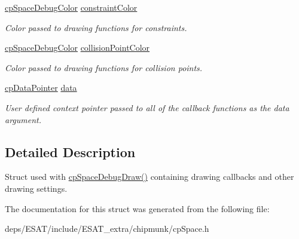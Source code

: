 \begin{DoxyCompactItemize}
\mbox{\hyperlink{structcp_space_debug_color}{cp\+Space\+Debug\+Color}} \mbox{\hyperlink{structcp_space_debug_draw_options_a62271599c7cb15d39f6a2b4620173322}{constraint\+Color}}
\begin{DoxyCompactList}\small\item\em Color passed to drawing functions for constraints. \end{DoxyCompactList}\item 
\mbox{\label{structcp_space_debug_draw_options_aaa3ebd801675e71f6ce0954514d3e9aa}} 
\mbox{\hyperlink{structcp_space_debug_color}{cp\+Space\+Debug\+Color}} \mbox{\hyperlink{structcp_space_debug_draw_options_aaa3ebd801675e71f6ce0954514d3e9aa}{collision\+Point\+Color}}
\begin{DoxyCompactList}\small\item\em Color passed to drawing functions for collision points. \end{DoxyCompactList}\item 
\mbox{\label{structcp_space_debug_draw_options_a68c76e73a9a75b589bb1d26925fcc3e4}} 
\mbox{\hyperlink{group__basic_types_ga2ac2c3c31e21893941f9e4f8ee279447}{cp\+Data\+Pointer}} \mbox{\hyperlink{structcp_space_debug_draw_options_a68c76e73a9a75b589bb1d26925fcc3e4}{data}}
\begin{DoxyCompactList}\small\item\em User defined context pointer passed to all of the callback functions as the \textquotesingle{}data\textquotesingle{} argument. \end{DoxyCompactList}\end{DoxyCompactItemize}


\subsection{Detailed Description}
Struct used with \mbox{\hyperlink{group__cp_space_ga02e8a34681aff3f29bd976e830f3b6da}{cp\+Space\+Debug\+Draw()}} containing drawing callbacks and other drawing settings. 

The documentation for this struct was generated from the following file\+:\begin{DoxyCompactItemize}
\item 
deps/\+E\+S\+A\+T/include/\+E\+S\+A\+T\+\_\+extra/chipmunk/cp\+Space.\+h\end{DoxyCompactItemize}
